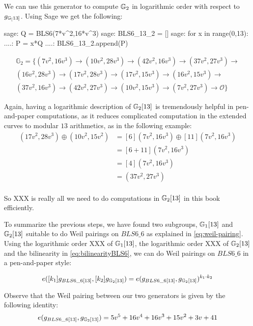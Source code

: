 We can use this generator to compute $\mathbb{G}_2$ in logarithmic order with respect to $g_{\mathbb{G}_[13]}$. Using Sage we get the following:
\begin{sagecommandline}
sage: Q = BLS6(7*v^2,16*v^3)
sage: BLS6_13_2 = []
sage: for x in range(0,13):
....:     P = x*Q
....:     BLS6_13_2.append(P)
\end{sagecommandline}
\begin{multline}
\label{BLS6-G2-log}
\mathbb{G}_2=\{
(7v^2, 16v^3) \to
(10v^2, 28v^3)\to
(42v^2, 16v^3)\to
(37v^2, 27v^3)\to\\
(16v^2, 28v^3)\to
(17v^2, 28v^3)\to
(17v^2, 15v^3)\to
(16v^2, 15v^3)\to\\
(37v^2, 16v^3)\to
(42v^2, 27v^3)\to
(10v^2, 15v^3)\to
(7v^2, 27v^3)\to
\mathcal{O}\}
\end{multline}

Again, having a logarithmic description of $\mathbb{G}_2[13]$ is tremendously helpful in pen-and-paper computations, as it reduces complicated computation in the extended curves to modular $13$ arithmetics, as in the following example:
\begin{align*}
(17v^2,28v^3)\oplus (10v^2,15v^2)  & = [6](7v^2,16v^3)\oplus [11](7v^2,16v^3)\\
                      & = [6+11](7v^2,16v^3)\\
                      & = [4](7v^2,16v^3)\\
                      & = (37v^2,27v^3)\\
\end{align*}

So XXX is really all we need to do computations in $\mathbb{G}_2[13]$ in this book efficiently. 

To summarize the previous steps, we have found two subgroups, $\mathbb{G}_1[13]$ and $\mathbb{G}_2[13]$ suitable to do Weil pairings on $BLS6\_6$ as explained in \ref{eq:weil-pairing}. Using the logarithmic order XXX of $\mathbb{G}_1[13]$, the logarithmic order XXX of $\mathbb{G}_2[13]$ and the bilinearity in \ref{eq:bilinearityBLS6}, we can do Weil pairings on $BLS6\_6$ in a pen-and-paper style:

\begin{equation}\label{eq:bilinearityBLS6}
e([k_1]g_{BLS6\_6[13]},[k_2]g_{\mathbb{G}_2[13]}) = 
e(g_{BLS6\_6[13]},g_{\mathbb{G}_2[13]})^{k_1\cdot k_2}
\end{equation}

Observe that the Weil pairing between our two generators is given by the following identity:
\begin{equation}\label{BLS6-weil-pairing}
e(g_{BLS6\_6[13]},g_{\mathbb{G}_2[13]})= 5v^5 + 16v^4 + 16v^3 + 15v^2 + 3v + 41
\end{equation}

